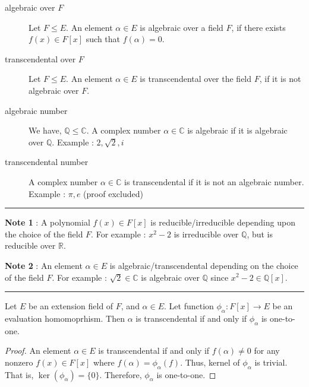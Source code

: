 \begin{description}
	\item[algebraic over $F$] Let $F \le E$.
		An element $\alpha \in E$ is algebraic over a field $F$, if there exists $f(x) \in F[x]$ such that $f(\alpha) = 0$.
	\item[transcendental over $F$] Let $F \le E$.
		An element $\alpha \in E$ is transcendental over the field $F$, if it is not algebraic over $F$.
	\item[algebraic number] We have, $\mathbb{Q} \le \mathbb{C}$. A complex number $\alpha \in \mathbb{C}$ is algebraic if  it is algebraic over $\mathbb{Q}$.
		Example : $2,\sqrt{2},i$
	\item[transcendental number] A complex number $\alpha \in \mathbb{C}$ is transcendental if it is not an algebraic number.
		Example : $\pi,e$ (proof excluded)
\end{description}
\hrule \vspace{1em}
\textbf{Note 1} : A polynomial $f(x) \in F[x]$ is reducible/irreducible depending upon the choice of the field $F$.
For example : $x^2-2$ is irreducible over $\mathbb{Q}$, but is reducible over $\mathbb{R}$.

\textbf{Note 2} : An element $\alpha \in E$ is algebraic/transcendental depending on the choice of the field $F$.
For example : $\sqrt{2} \in \mathbb{C}$ is algebraic over $\mathbb{Q}$ since $x^2-2 \in \mathbb{Q}[x]$.
\hrule \vspace{1em}
\begin{theorem}
	Let $E$ be an extension field of $F$, and $\alpha \in E$.
	Let function $\phi_\alpha : F[x] \to E$ be an evaluation homomoprhism.
	Then $\alpha$ is transcendental  if and only if $\phi_\alpha$ is one-to-one.
\end{theorem}
\begin{proof}
	An element $\alpha \in E$ is transcendental if and only if $f(\alpha) \ne 0$ for any nonzero $f(x) \in F[x]$ where $f(\alpha) = \phi_\alpha(f)$.
	Thus, kernel of $\phi_\alpha$ is trivial.
	That is, $\ker(\phi_\alpha) = \{ 0 \}$.
	Therefore, $\phi_\alpha$ is one-to-one.
\end{proof}

